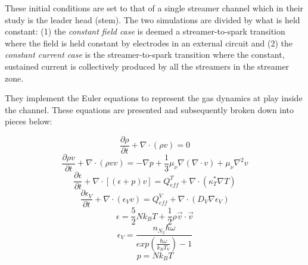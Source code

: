 \documentclass[]{article}
\begin{document}
	These initial conditions are set to that of a single streamer channel which in their study is the leader head (stem). The two simulations are divided by what is held constant: (1) the \textit{constant field case} is deemed a streamer-to-spark transition where the field is held constant by electrodes in an external circuit and (2) the \textit{constant current case} is the streamer-to-spark transition where the constant, sustained current is collectively produced by all the streamers in the streamer zone.
	
	They implement the Euler equations to represent the gas dynamics at play inside the channel. These equations are presented and subsequently broken down into pieces below:
	
	\begin{equation}
	\frac{\partial\rho}{\partial t} + \nabla \cdot (\rho v) = 0
	\end{equation} 
	\begin{equation}
	\frac{\partial \rho v}{\partial t} + \nabla \cdot (\rho v v) = -\nabla p + \frac{1}{3} \mu_{\nu} \nabla(\nabla \cdot v) + \mu_{\nu} \nabla^2v 
	\end{equation}
	\begin{equation}
	\frac{\partial \epsilon}{\partial t} + \nabla \cdot [(\epsilon + p)v] = Q_{eff}^T + \nabla \cdot(\kappa^*_T\nabla T) 
	\end{equation}	 
	\begin{equation}
	\frac{\partial \epsilon_V}{\partial t} + \nabla \cdot (\epsilon_Vv) = Q_{eff}^V + \nabla \cdot(D_V\nabla\epsilon_V) 
	\end{equation}
	\begin{equation}
	\epsilon = \frac{5}{2} N k_B T + \frac{1}{2}\rho \vec{v} \cdot \vec{v} 
	\end{equation}
	\begin{equation}
	\epsilon_V = \frac{n_{N_2} \hbar \omega}{exp(\frac{\hbar \omega}{k_B T_V})-1}
	\end{equation}
	\begin{equation}
	p = N k_B T
	\end{equation}
	
\end{document}
